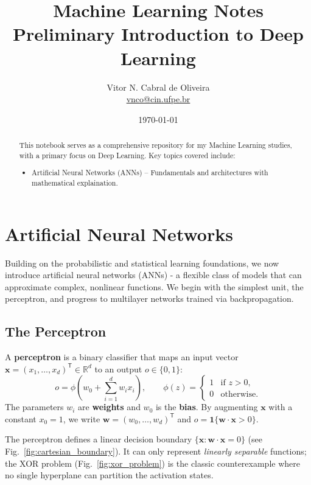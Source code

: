 \documentclass{tufte-handout}
\title{Machine Learning Notes \\ Preliminary Introduction to Deep Learning}
\author{Vitor N. Cabral de Oliveira\\ \href{mailto:vnco@cin.ufpe.br}{vnco@cin.ufpe.br}}
\date{\today}
\begin{document}
\maketitle
\begin{abstract}
    This notebook serves as a comprehensive repository for my Machine Learning studies, with a primary focus on Deep Learning. Key topics covered include:
    \begin{itemize}
        \item Artificial Neural Networks (ANNs) – Fundamentals and architectures with mathematical explaination.
    \end{itemize}
\end{abstract}

\newpage
\hypersetup{linkcolor=wp-text}
\tableofcontents
\hypersetup{linkcolor=wp-primary}
\newpage

\section{Artificial Neural Networks}

Building on the probabilistic and statistical learning foundations, we now introduce artificial neural networks (ANNs) - 
a flexible class of models that can approximate complex, nonlinear functions. We begin with the simplest unit, the perceptron, 
and progress to multilayer networks trained via backpropagation.

\subsection{The Perceptron}

\begin{defn}[Perceptron]
    A \textbf{perceptron} is a binary classifier that maps an input vector $\mathbf{x} = (x_1,\dots,x_d)^{\mathsf{T}} \in \mathbb{R}^d$ to
     an output $o \in \{0,1\}$:
    $$
    o = \phi\!\left(w_0 + \sum_{i=1}^{d} w_i x_i\right),\qquad 
    \phi(z) = \begin{cases}
        1 & \text{if } z > 0,\\
        0 & \text{otherwise}.
    \end{cases}
    $$
    The parameters $w_i$ are \textbf{weights} and $w_0$ is the \textbf{bias}. By augmenting $\mathbf{x}$ with a constant $x_0=1$, we write $\mathbf{w}=(w_0,\dots,w_d)^{\mathsf{T}}$ and $o = \mathbf{1}\{\mathbf{w}\cdot\mathbf{x} > 0\}$.
\end{defn}

The perceptron defines a linear decision boundary $\{\mathbf{x} : \mathbf{w}\cdot\mathbf{x}=0\}$ (see Fig.~\ref{fig:cartesian_boundary}). 
It can only represent \textit{linearly separable} functions; the XOR problem (Fig.~\ref{fig:xor_problem}) is the 
classic counterexample where no single hyperplane can partition the activation states.
\end{document}
